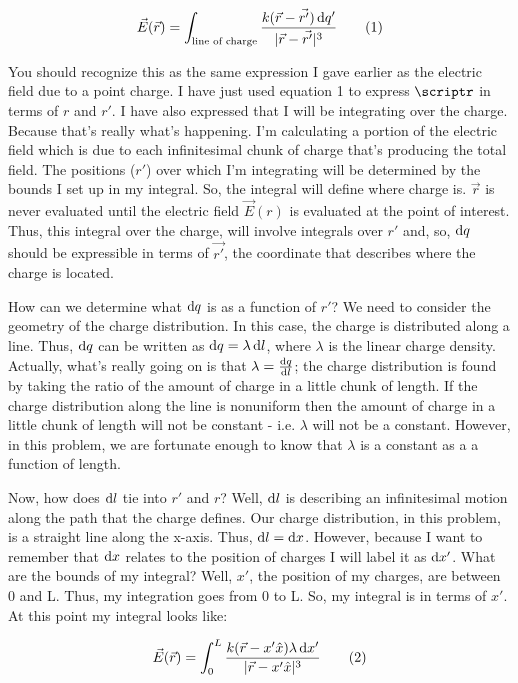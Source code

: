\begin{homeworkProblem}[Problem 23.42]
\[ \vec{E}(\vec{r}) = \int_{\text{line of charge}} \frac{k (\vec{r}-\vec{r'}) \diff q'}{|\vec{r}-\vec{r'}|^3} \addtag \]

You should recognize this as the same expression I gave earlier as the electric field due to a point charge. I have just used equation 1 to express $\scriptr$ in terms of $r$ and $r'$. I have also expressed that I will be integrating over the charge. Because that's really what's happening. I'm calculating a portion of the electric field which is due to each infinitesimal chunk of charge that's producing the total field. The positions ($r'$) over which I'm integrating will be determined by the bounds I set up in my integral. So, the integral will define where charge is. $\vec{r}$ is never evaluated until the electric field $\vec{E}(r)$ is evaluated at the point of interest. Thus, this integral over the charge, will involve integrals over $r'$ and, so, $\mathop{}\!\mathrm{d} q$ should be expressible in terms of $\vec{r'}$, the coordinate that describes where the charge is located.

How can we determine what $\mathop{}\!\mathrm{d} q$ is as a function of $r'$? We need to consider the geometry of the charge distribution. In this case, the charge is distributed along a line. Thus, $\mathop{}\!\mathrm{d} q$ can be written as $ \mathop{}\!\mathrm{d} q = \lambda \mathop{}\!\mathrm{d} l$, where $\lambda$ is the linear charge density. Actually, what's really going on is that $\lambda = \frac{\mathop{}\!\mathrm{d} q}{\mathop{}\!\mathrm{d} l}$; the charge distribution is found by taking the ratio of the amount of charge in a little chunk of length. If the charge distribution along the line is nonuniform then the amount of charge in a little chunk of length will not be constant - i.e. $\lambda$ will not be a constant. However, in this problem, we are fortunate enough to know that $\lambda$ is a constant as a a function of length.

Now, how does $\mathop{}\!\mathrm{d} l$ tie into $r'$ and $r$? Well, $\mathop{}\!\mathrm{d} l$ is describing an infinitesimal motion along the path that the charge defines. Our charge distribution, in this problem, is a straight line along the x-axis. Thus, $\mathop{}\!\mathrm{d} l = \mathop{}\!\mathrm{d} x$. However, because I want to remember that $\mathop{}\!\mathrm{d} x$ relates to the position of charges I will label it as $\mathop{}\!\mathrm{d} x'$. What are the bounds of my integral? Well, $x'$, the position of my charges, are between 0 and L. Thus, my integration goes from 0 to L. So, my integral is in terms of $x'$. At this point my integral looks like: 

\[ \vec{E}(\vec{r}) = \int_0^L \frac{k (\vec{r}-x'\hat{x}) \lambda \diff x'}{|\vec{r}-x'\hat{x}|^3} \addtag \]


\end{homeworkProblem}
